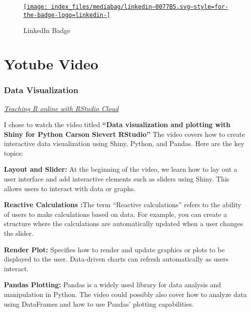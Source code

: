 \documentclass[
  letterpaper,
  DIV=11,
  numbers=noendperiod]{scrreprt}
\begin{document}
\begin{figure}

{\centering 

\href{https://www.linkedin.com/in/özgenurşensoy/}{\texttt{[image: index\_files/mediabag/linkedin--0077B5.svg--style=for-the-badge-logo=linkedin-]}}

}

\caption{LinkedIn Badge}

\end{figure}


\hypertarget{yotube-video}{%
\chapter{\textbar{} Yotube Video}\label{yotube-video}}

\hypertarget{data-visualization}{%
\subsection{Data Visualization}\label{data-visualization}}

\href{https://www.youtube.com/watch?v=5zJC0AB-UK8\&list=PL9HYL-VRX0oTOK4cpbCbRk15K2roEgzVW\&index=21}{\emph{Teaching
R online with RStudio Cloud}}

I chose to watch the video titled \textbf{``Data visualization and
plotting with Shiny for Python \textbar\textbar{} Carson Sievert
\textbar\textbar{} RStudio''} The video covers how to create interactive
data visualization using Shiny, Python, and Pandas. Here are the key
topics:

\textbf{Layout and Slider:} At the beginning of the video, we learn how
to lay out a user interface and add interactive elements such as sliders
using Shiny. This allows users to interact with data or graphs.

\textbf{Reactive Calculations :}The term ``Reactive calculations''
refers to the ability of users to make calculations based on data. For
example, you can create a structure where the calculations are
automatically updated when a user changes the slider.

\textbf{Render Plot:} Specifies how to render and update graphics or
plots to be displayed to the user. Data-driven charts can refresh
automatically as users interact.

\textbf{Pandas Plotting:} Pandas is a widely used library for data
analysis and manipulation in Python. The video could possibly also cover
how to analyze data using DataFrames and how to use Pandas' plotting
capabilities.
\end{document}
